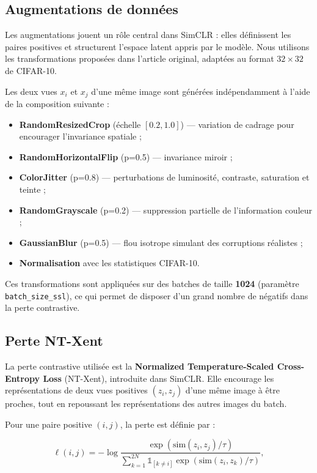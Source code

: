 \documentclass[12pt,a4paper]{report}
\begin{document}
	\subsection{Augmentations de données}
	
	Les augmentations jouent un rôle central dans SimCLR : elles définissent les paires positives et structurent l’espace latent appris par le modèle.  
	Nous utilisons les transformations proposées dans l’article original, adaptées au format $32\times32$ de CIFAR-10.
	
	Les deux vues $x_i$ et $x_j$ d’une même image sont générées indépendamment à l’aide de la composition suivante :
	\begin{itemize}
		\item \textbf{RandomResizedCrop} (échelle $[0.2, 1.0]$) — variation de cadrage pour encourager l’invariance spatiale ;
		\item \textbf{RandomHorizontalFlip} (p=0.5) — invariance miroir ;
		\item \textbf{ColorJitter} (p=0.8) — perturbations de luminosité, contraste, saturation et teinte ;
		\item \textbf{RandomGrayscale} (p=0.2) — suppression partielle de l’information couleur ;
		\item \textbf{GaussianBlur} (p=0.5) — flou isotrope simulant des corruptions réalistes ;
		\item \textbf{Normalisation} avec les statistiques CIFAR-10.
	\end{itemize}
	
	Ces transformations sont appliquées sur des batches de taille \textbf{1024} (paramètre \texttt{batch\_size\_ssl}), ce qui permet de disposer d’un grand nombre de négatifs dans la perte contrastive.
	
	
	\subsection{Perte NT-Xent}
	
	La perte contrastive utilisée est la \textbf{Normalized Temperature-Scaled Cross-Entropy Loss} (NT-Xent), introduite dans SimCLR.  
	Elle encourage les représentations de deux vues positives $(z_i, z_j)$ d’une même image à être proches, tout en repoussant les représentations des autres images du batch.
	
	Pour une paire positive $(i,j)$, la perte est définie par :
	
	
	\[
	\ell(i,j) = - \log 
	\frac{\exp(\mathrm{sim}(z_i, z_j)/\tau)}
	{\sum_{k=1}^{2N} \mathbb{1}_{[k \neq i]} \exp(\mathrm{sim}(z_i, z_k)/\tau)},
	\]
	
\end{document}
